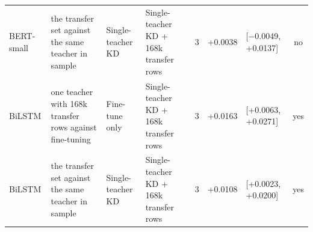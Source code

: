 {\begin{longtable}{p{1.5cm}p{2.9cm}p{2.5cm}p{2.6cm}cp{1.0cm}p{1.8cm}c}
BERT-small & the transfer set against the same teacher in sample & Single-teacher KD & Single-teacher KD + 168k transfer rows & 3 & +0.0038 & [$-$0.0049, +0.0137] & no \\
BiLSTM & one teacher with 168k transfer rows against fine-tuning & Fine-tune only & Single-teacher KD + 168k transfer rows & 3 & +0.0163 & [+0.0063, +0.0271] & yes \\
BiLSTM & the transfer set against the same teacher in sample & Single-teacher KD & Single-teacher KD + 168k transfer rows & 3 & +0.0108 & [+0.0023, +0.0200] & yes \\
\end{longtable}
}
